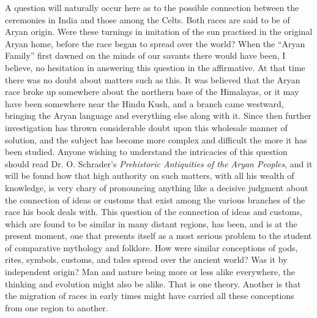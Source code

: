 \documentclass[a4paper, 11pt, oneside, polutonikogreek, english]{article}
\begin{document}
A question will naturally occur here as to the possible connection between the ceremonies in India and those among the Celts. Both races are said to be of Aryan origin. Were these turnings in imitation of the sun practised in the original Aryan home, before the race began to spread over the world? When the ``Aryan Family'' first dawned on the minds of our savants there would have been, I believe, no hesitation in answering this question in the affirmative. At that time there was no doubt about matters such as this. It was believed that the Aryan race broke up somewhere about the northern base of the Himalayas, or it may have been somewhere near the Hindu Kush, and a branch came westward, bringing the Aryan language and everything else along with it. Since then further investigation has thrown considerable doubt upon this wholesale manner of solution, and the subject has become more complex and difficult the more it has been studied. Anyone wishing to understand the intricacies of this question should read Dr. O. Schrader's \emph{Prehistoric Antiquities of the Aryan Peoples}, and it will be found how that high authority on such matters, with all his wealth of knowledge, is very chary of pronouncing anything like a decisive judgment about the connection of ideas or customs that exist among the various branches of the race his book deals with. This question of the connection of ideas and customs, which are found to be similar in many distant regions, has been, and is at the present moment, one that presents itself as a most serious problem to the student of comparative mythology and folklore. How were similar conceptions of gods, rites, symbols, customs, and tales spread over the ancient world? Was it by independent origin? Man and nature being more or less alike everywhere, the thinking and evolution might also be alike. That is one theory. Another is that the migration of races in early times might have carried all these conceptions from one region to another.
\end{document}
